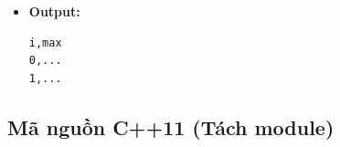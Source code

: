 \begin{itemize}
\begin{itemize}
        \item \textbf{Module 3 (Ghi file CSV):}
        \begin{itemize}
            \item File \texttt{rolling\_max.csv}
            \item Header: \texttt{i,max}
        \end{itemize}
    \end{itemize}

    \item \textbf{Output:}
\begin{lstlisting}
i,max
0,...
1,...
\end{lstlisting}
\end{itemize}

\subsection{Mã nguồn C++11 (Tách module)}

